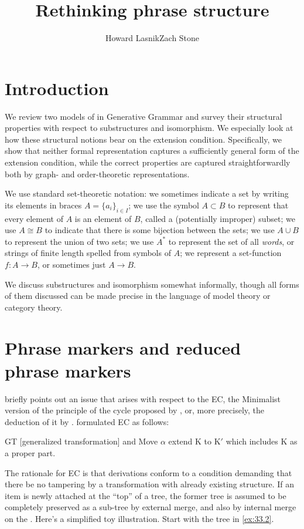 \documentclass[output=paper]{langsci/langscibook}
\author{Howard Lasnik\affiliation{University of Maryland at College Park}\lastand Zach Stone\affiliation{University of Maryland at College Park}}
\title{Rethinking phrase structure}
\begin{document}
\glsresetall

\section{Introduction}

We review two models of  in Generative Grammar and survey their
structural properties with respect to substructures and isomorphism. We
especially look at how these structural notions bear on the extension
condition. Specifically, we show that neither formal representation captures a
sufficiently general form of the extension condition, while the correct
properties are captured straightforwardly both by graph- and order-theoretic
representations.

We use standard set-theoretic notation: we sometimes indicate a set by writing
its elements  in braces $A=\{a_i\}_{i\in I}$; we use the symbol $A\subset B$ to
represent that every element of $A$ is an element of $B$, called a (potentially
improper) subset; we use $A\cong B$ to indicate that there is some bijection
between the sets; we use $A\cup B$ to represent the union of two sets; we use
$A^*$ to represent the set of all \emph{words}, or strings of finite length
spelled from symbols of $A$; we represent a set-function $f:A\rightarrow B$, or
sometimes just $A\rightarrow B$.

We discuss substructures and isomorphism somewhat informally, though all forms
of them discussed can be made precise in the language of model theory or
category theory.

\section{Phrase markers and reduced phrase markers}

\citet{conceptions} briefly points out an issue that arises with respect to the
\gls{EC}, the Minimalist version of the principle of the cycle proposed by
\citet{Chomsky1993}, or, more precisely, the deduction of it by
\citet{Chomsky2000}. \textcite[22]{Chomsky1993} formulated \gls{EC} as follows:

\ea\label{ex:33.1} GT [generalized
    transformation] and Move $\alpha$ extend K to K$'$ which includes K
    as a proper part.
\z

The \textcite{Chomsky2000} rationale for \gls{EC} is that derivations conform to a
condition demanding that there be no tampering by a transformation with already
existing structure. If an item is newly attached at the \enquote{top} of a tree, the
former tree is assumed to be completely preserved as a sub-tree by external
merge, and also by internal merge on the . Here's a
simplified toy illustration. Start with the tree in \eqref{ex:33.2}.
\end{document}
